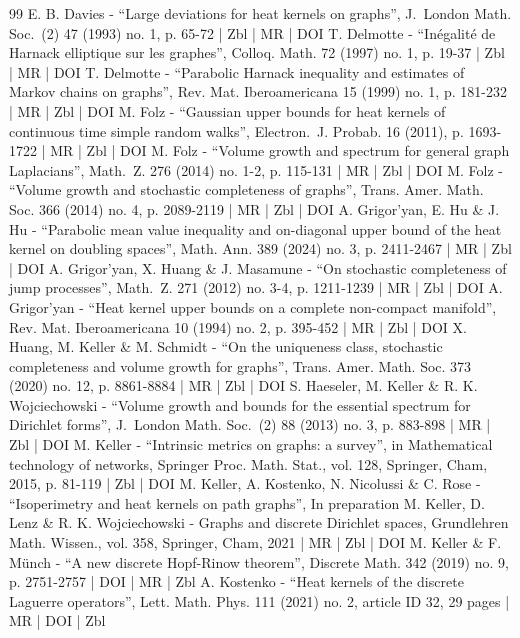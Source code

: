 \begin{thebibliography}{99}
E. B. Davies - “Large deviations for heat kernels on graphs”, J. London Math. Soc. (2) 47 (1993) no. 1, p. 65-72 | Zbl | MR | DOI
T. Delmotte - “Inégalité de Harnack elliptique sur les graphes”, Colloq. Math. 72 (1997) no. 1, p. 19-37 | Zbl | MR | DOI
T. Delmotte - “Parabolic Harnack inequality and estimates of Markov chains on graphs”, Rev. Mat. Iberoamericana 15 (1999) no. 1, p. 181-232 | MR | Zbl | DOI
M. Folz - “Gaussian upper bounds for heat kernels of continuous time simple random walks”, Electron. J. Probab. 16 (2011), p. 1693-1722 | MR | Zbl | DOI
M. Folz - “Volume growth and spectrum for general graph Laplacians”, Math. Z. 276 (2014) no. 1-2, p. 115-131 | MR | Zbl | DOI
M. Folz - “Volume growth and stochastic completeness of graphs”, Trans. Amer. Math. Soc. 366 (2014) no. 4, p. 2089-2119 | MR | Zbl | DOI
A. Grigor’yan, E. Hu \& J. Hu - “Parabolic mean value inequality and on-diagonal upper bound of the heat kernel on doubling spaces”, Math. Ann. 389 (2024) no. 3, p. 2411-2467 | MR | Zbl | DOI
A. Grigor’yan, X. Huang \& J. Masamune - “On stochastic completeness of jump processes”, Math. Z. 271 (2012) no. 3-4, p. 1211-1239 | MR | Zbl | DOI
A. Grigor’yan - “Heat kernel upper bounds on a complete non-compact manifold”, Rev. Mat. Iberoamericana 10 (1994) no. 2, p. 395-452 | MR | Zbl | DOI
X. Huang, M. Keller \& M. Schmidt - “On the uniqueness class, stochastic completeness and volume growth for graphs”, Trans. Amer. Math. Soc. 373 (2020) no. 12, p. 8861-8884 | MR | Zbl | DOI
S. Haeseler, M. Keller \& R. K. Wojciechowski - “Volume growth and bounds for the essential spectrum for Dirichlet forms”, J. London Math. Soc. (2) 88 (2013) no. 3, p. 883-898 | MR | Zbl | DOI
M. Keller - “Intrinsic metrics on graphs: a survey”, in Mathematical technology of networks, Springer Proc. Math. Stat., vol. 128, Springer, Cham, 2015, p. 81-119 | Zbl | DOI
M. Keller, A. Kostenko, N. Nicolussi \& C. Rose - “Isoperimetry and heat kernels on path graphs”, In preparation
M. Keller, D. Lenz \& R. K. Wojciechowski - Graphs and discrete Dirichlet spaces, Grundlehren Math. Wissen., vol. 358, Springer, Cham, 2021 | MR | Zbl | DOI
M. Keller \& F. Münch - “A new discrete Hopf-Rinow theorem”, Discrete Math. 342 (2019) no. 9, p. 2751-2757 | DOI | MR | Zbl
A. Kostenko - “Heat kernels of the discrete Laguerre operators”, Lett. Math. Phys. 111 (2021) no. 2, article ID 32, 29 pages | MR | DOI | Zbl

\end{thebibliography}
